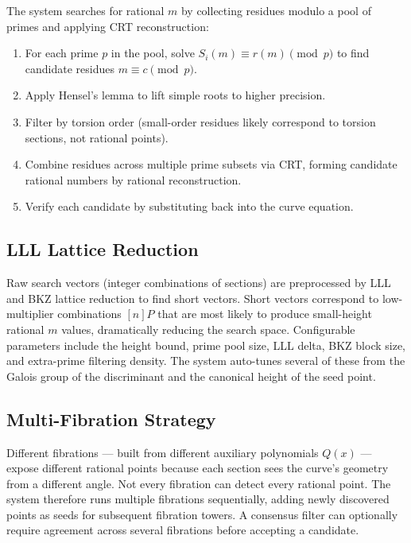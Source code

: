 \documentclass[11pt, a4paper]{article}
\begin{document}
The system searches for rational $m$ by collecting residues modulo a pool of primes and applying CRT reconstruction:

\begin{enumerate}
    \item For each prime $p$ in the pool, solve $S_i(m) \equiv r(m) \pmod{p}$ to find candidate residues $m \equiv c \pmod{p}$.
    \item Apply Hensel's lemma to lift simple roots to higher precision.
    \item Filter by torsion order (small-order residues likely correspond to torsion sections, not rational points).
    \item Combine residues across multiple prime subsets via CRT, forming candidate rational numbers by rational reconstruction.
    \item Verify each candidate by substituting back into the curve equation.
\end{enumerate}

\subsection{LLL Lattice Reduction}

Raw search vectors (integer combinations of sections) are preprocessed by LLL and BKZ lattice reduction to find short vectors. Short vectors correspond to low-multiplier combinations $[n]P$ that are most likely to produce small-height rational $m$ values, dramatically reducing the search space. Configurable parameters include the height bound, prime pool size, LLL delta, BKZ block size, and extra-prime filtering density. The system auto-tunes several of these from the Galois group of the discriminant and the canonical height of the seed point.

\subsection{Multi-Fibration Strategy}

Different fibrations --- built from different auxiliary polynomials $Q(x)$ --- expose different rational points because each section sees the curve's geometry from a different angle. Not every fibration can detect every rational point. The system therefore runs multiple fibrations sequentially, adding newly discovered points as seeds for subsequent fibration towers. A consensus filter can optionally require agreement across several fibrations before accepting a candidate.
\end{document}
